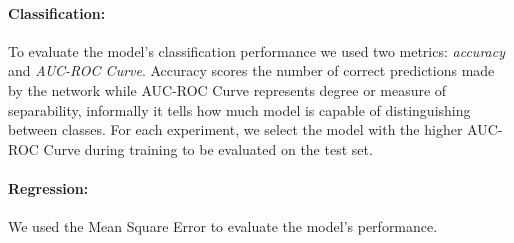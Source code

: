 \documentclass[../document.tex]{subfiles}
\begin{document}
\paragraph{Classification:} To evaluate the model's classification performance we used two metrics: \emph{accuracy} and \emph{AUC-ROC Curve}. Accuracy scores the number of correct predictions made by the network while AUC-ROC Curve represents degree or measure of separability, informally it tells how much model is capable of distinguishing between classes. For each experiment, we select the model with the higher AUC-ROC Curve during training to be evaluated on the test set.
\paragraph{Regression:} We used the Mean Square Error to evaluate the model's performance.
\end{document}
